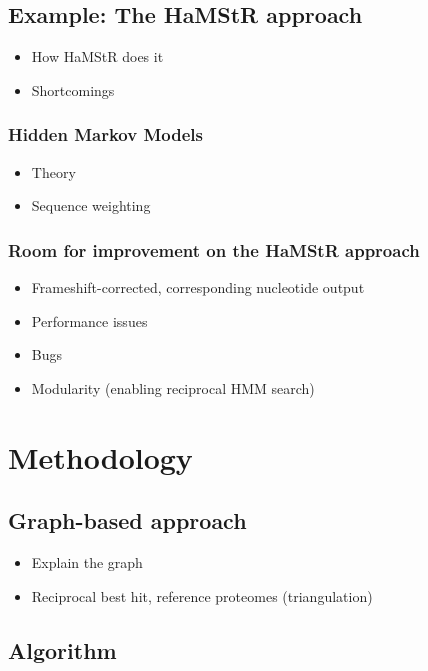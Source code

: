 \documentclass[a4paper]{scrartcl}
\begin{document}
\subsection{Example: The HaMStR approach}

\begin{itemize}
	\item How HaMStR does it
	\item Shortcomings
\end{itemize}

\subsubsection{Hidden Markov Models}

\begin{itemize}
	\item Theory
	\item Sequence weighting
\end{itemize}

\subsubsection{Room for improvement on the HaMStR approach}

\begin{itemize}
	\item Frameshift-corrected, corresponding nucleotide output
	\item Performance issues
	\item Bugs
	\item Modularity (enabling reciprocal HMM search)
\end{itemize}

\clearpage

\section{Methodology}

\subsection{Graph-based approach}

\begin{itemize}
	\item Explain the graph
	\item Reciprocal best hit, reference proteomes (triangulation)
\end{itemize}

\subsection{Algorithm}
\end{document}
